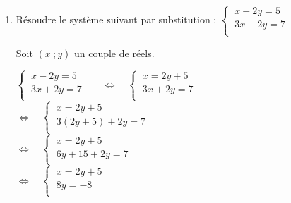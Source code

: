 \documentclass[a4paper,11pt,exos]{nsi}
\begin{document}
\exo{}
    \begin{enumerate}
        \item \textcolor{UGLiBlue}{Résoudre le système suivant par substitution : $\left\{
			\begin{array}{l}
				\ x-2y=5 \\
				\ 3x+2y=7 \\
			\end{array} \right.$}
        
    Soit $(x\ ;y)$ un couple de réels.
            \begin{tabbing}
                $\left\{
                    \begin{array}{l}
                    \ x-2y=5 \\
                    \ 3x+2y=7 \\
                \end{array} \right. \quad$
                \= $\iff \quad \left\{
                    \begin{array}{l}
                    \ x=2y+5 \\
                    \ 3x+2y=7  \\
                \end{array} \right.$\\[1em]
                
                \>  $\iff \quad \left\{
                    \begin{array}{l}
                    \ x=2y+5 \\
                    \ 3(2y+5)+2y=7\\
                \end{array} \right.$\\[1em]

                \>  $\iff \quad \left\{
                    \begin{array}{l}
                    \ x=2y+5 \\
                    \ 6y+15+2y=7\\
                \end{array} \right.$\\[1em]

                \>  $\iff \quad \left\{
                    \begin{array}{l}
                    \ x=2y+5 \\
                    \ 8y=-8\\
                \end{array} \right.$\\[1em]


\end{tabbing}
\end{enumerate}
\end{document}
